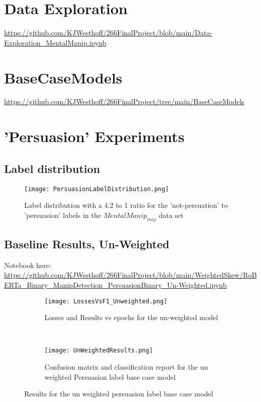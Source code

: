 \documentclass[
	letterpaper, %
	12pt, %
	unnumberedsections, %
	twoside, %
]{LTJournalArticle}
\begin{document}
\begin{appendices}
	\onecolumn
	\section{Data Exploration}\label{appendix:DataExploration}
	\url{https://github.com/KJWesthoff/266FinalProject/blob/main/Data-Exploration_MentalManip.ipynb}

	\section{BaseCaseModels}\label{appendix:BaseCaseModels}
	\url{https://github.com/KJWesthoff/266FinalProject/tree/main/BaseCaseModels}

	\section{'Persuasion' Experiments}\label{appendix:PersuasionExperiments}
	\subsection{Label distribution}\label{appendix:PersuasionLabelDistribution}
	\begin{figure}[!htp] %
		\centering
		\texttt{[image: PersuasionLabelDistribution.png]}
		\caption{Label distribution with a 4.2 to 1 ratio for the 'not-persuation' to  'persuasion' labels in the $MentalManip_{maj}$ data set}
		\label{fig:PersuasionLabelDistribution}
	\end{figure}


	\subsection{Baseline Results, Un-Weighted}\label{appendix:UnWeightedResults}
	Notebook here:
	\url{https://github.com/KJWesthoff/266FinalProject/blob/main/WeightedSkew/RoBERTa_Binary_ManipDetection_PersuasionBinary_Un-Weighted.ipynb}



	\begin{figure*}[t!]
		\centering
		\begin{subfigure}[t]{0.5\textwidth}
			\centering
			\texttt{[image: LossesVsF1\_Unweighted.png]}
			\caption{Losses and Results vs epochs for the un-weighted model}
			\label{fig:UnWeightedEpochPlot}
		\end{subfigure}%
		~
		\begin{subfigure}[t]{0.4\textwidth}
			\texttt{[image: UnWeightedResults.png]}
			\caption{Confusion matrix and classification report for the un weighted Persuasion label base case model}
			\label{fig:UNWeightedResults}
			\centering
		\end{subfigure}
		\caption{Results for the un weighted persuasion label base case model}
	\end{figure*}












\end{appendices}
\end{document}
